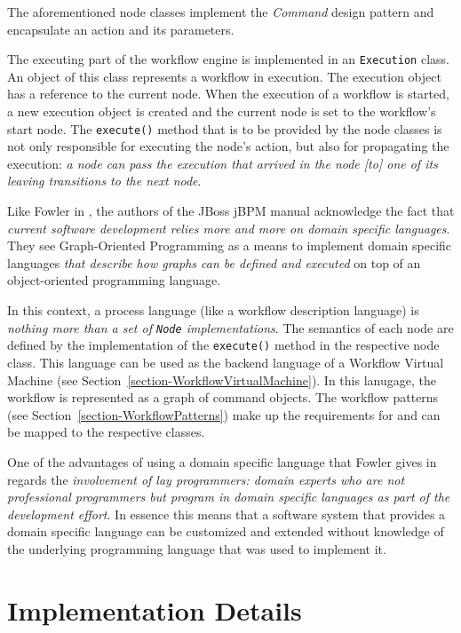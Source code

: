 The aforementioned node classes implement the \emph{Command} design pattern
\cite{GoF94} and encapsulate an action and its parameters.

The executing part of the workflow engine is implemented in an
\texttt{Execution} class. An object of this class represents a workflow in
execution. The execution object has a reference to the current node. When the
execution of a workflow is started, a new execution object is created and the
current node is set to the workflow's start node. The \texttt{execute()}
method that is to be provided by the node classes is not only responsible for
executing the node's action, but also for propagating the execution:
\emph{a node can pass the execution that arrived in the node [to] one of its
leaving transitions to the next node}.

Like Fowler in \cite{MF05}, the authors of the JBoss jBPM manual acknowledge
the fact that \emph{current software development relies more and more on domain
specific languages}. They see Graph-Oriented Programming as a means to
implement domain specific languages \emph{that describe how graphs can be
defined and executed} on top of an object-oriented programming language.

In this context, a process language (like a workflow description language) is
\emph{nothing more than a set of \texttt{Node} implementations}. The semantics
of each node are defined by the implementation of the \texttt{execute()}
method in the respective node class. This language can be used as the backend
language of a Workflow Virtual Machine (see
Section~\ref{section-WorkflowVirtualMachine}). In this lanugage, the workflow
is represented as a graph of command objects. The workflow patterns (see
Section~\ref{section-WorkflowPatterns}) make up the requirements for and can
be mapped to the respective classes.

One of the advantages of using a domain specific language that Fowler gives in
\cite{MF05} regards the \emph{involvement of lay programmers: domain experts
who are not professional programmers but program in domain specific languages
as part of the development effort}. In essence this means that a software
system that provides a domain specific language can be customized and
extended without knowledge of the underlying programming language that was
used to implement it.

\section{Implementation Details}

